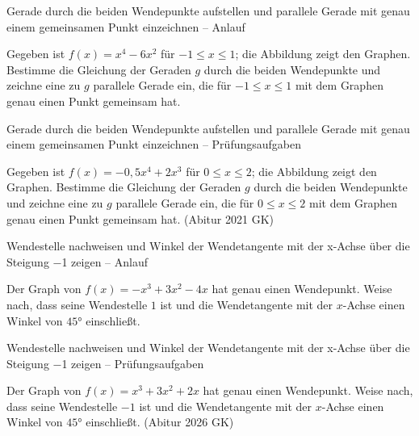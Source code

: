 \begin{aufgabe}{Gerade durch die beiden Wendepunkte aufstellen und parallele Gerade mit genau einem gemeinsamen Punkt einzeichnen – Anlauf}
\begin{teile}
\teil Gegeben ist $f(x) = x^4 - 6x^2$ für $-1 \le x \le 1$; die Abbildung zeigt den Graphen. Bestimme die Gleichung der Geraden $g$ durch die beiden Wendepunkte und zeichne eine zu $g$ parallele Gerade ein, die für $-1 \le x \le 1$ mit dem Graphen genau einen Punkt gemeinsam hat.

\begin{ksys}[xmin=-2,xmax=2,ymin=-6,ymax=2]  \end{ksys}
\end{teile}
\end{aufgabe}

\begin{aufgabe}{Gerade durch die beiden Wendepunkte aufstellen und parallele Gerade mit genau einem gemeinsamen Punkt einzeichnen – Prüfungsaufgaben}
\begin{teile}
\teil Gegeben ist $f(x) = -0{,}5x^4 + 2x^3$ für $0 \le x \le 2$; die Abbildung zeigt den Graphen. Bestimme die Gleichung der Geraden $g$ durch die beiden Wendepunkte und zeichne eine zu $g$ parallele Gerade ein, die für $0 \le x \le 2$ mit dem Graphen genau einen Punkt gemeinsam hat. \hfill (Abitur 2021 GK)

\begin{ksys}[xmin=-1,xmax=3,ymin=-3,ymax=9,ystep=2]  \end{ksys}
\end{teile}
\end{aufgabe}

\begin{aufgabe}{Wendestelle nachweisen und Winkel der Wendetangente mit der x-Achse über die Steigung −1 zeigen – Anlauf}
\begin{teile}
\teil Der Graph von $f(x) = -x^3 + 3x^2 - 4x$ hat genau einen Wendepunkt. Weise nach, dass seine Wendestelle $1$ ist und die Wendetangente mit der $x$-Achse einen Winkel von $45°$ einschließt.
\end{teile}
\end{aufgabe}

\begin{aufgabe}{Wendestelle nachweisen und Winkel der Wendetangente mit der x-Achse über die Steigung −1 zeigen – Prüfungsaufgaben}
\begin{teile}
\teil Der Graph von $f(x) = x^3 + 3x^2 + 2x$ hat genau einen Wendepunkt. Weise nach, dass seine Wendestelle $-1$ ist und die Wendetangente mit der $x$-Achse einen Winkel von $45°$ einschließt. \hfill (Abitur 2026 GK)
\end{teile}
\end{aufgabe}

